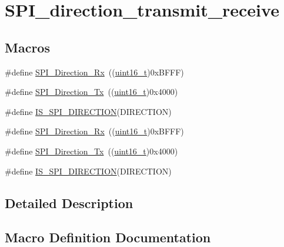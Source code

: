 \hypertarget{group___s_p_i__direction__transmit__receive}{}\section{S\+P\+I\+\_\+direction\+\_\+transmit\+\_\+receive}
\label{group___s_p_i__direction__transmit__receive}
\subsection*{Macros}
\begin{DoxyCompactItemize}
\item 
\#define \hyperlink{group___s_p_i__direction__transmit__receive_ga9a59d225a8cf42eebafbec6ad95c078c}{S\+P\+I\+\_\+\+Direction\+\_\+\+Rx}~((\hyperlink{_p_e___types_8h_a1f1825b69244eb3ad2c7165ddc99c956}{uint16\+\_\+t})0x\+B\+F\+F\+F)
\item 
\#define \hyperlink{group___s_p_i__direction__transmit__receive_gabd76982a7e305c13f7ad8ea1789d3c0c}{S\+P\+I\+\_\+\+Direction\+\_\+\+Tx}~((\hyperlink{_p_e___types_8h_a1f1825b69244eb3ad2c7165ddc99c956}{uint16\+\_\+t})0x4000)
\item 
\#define \hyperlink{group___s_p_i__direction__transmit__receive_gae96b69403c4206e347cde77b9a30e207}{I\+S\+\_\+\+S\+P\+I\+\_\+\+D\+I\+R\+E\+C\+T\+I\+ON}(D\+I\+R\+E\+C\+T\+I\+ON)
\item 
\#define \hyperlink{group___s_p_i__direction__transmit__receive_ga9a59d225a8cf42eebafbec6ad95c078c}{S\+P\+I\+\_\+\+Direction\+\_\+\+Rx}~((\hyperlink{_p_e___types_8h_a1f1825b69244eb3ad2c7165ddc99c956}{uint16\+\_\+t})0x\+B\+F\+F\+F)
\item 
\#define \hyperlink{group___s_p_i__direction__transmit__receive_gabd76982a7e305c13f7ad8ea1789d3c0c}{S\+P\+I\+\_\+\+Direction\+\_\+\+Tx}~((\hyperlink{_p_e___types_8h_a1f1825b69244eb3ad2c7165ddc99c956}{uint16\+\_\+t})0x4000)
\item 
\#define \hyperlink{group___s_p_i__direction__transmit__receive_gae96b69403c4206e347cde77b9a30e207}{I\+S\+\_\+\+S\+P\+I\+\_\+\+D\+I\+R\+E\+C\+T\+I\+ON}(D\+I\+R\+E\+C\+T\+I\+ON)
\end{DoxyCompactItemize}


\subsection{Detailed Description}


\subsection{Macro Definition Documentation}
